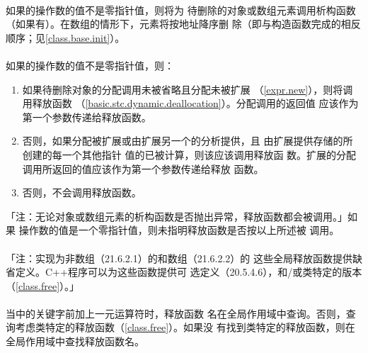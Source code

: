 \paragraph{}
如果的操作数的值不是零指针值，则将为
待删除的对象或数组元素调用析构函数（如果有）。在数组的情形下，元素将按地址降序删
除（即与构造函数完成的相反顺序；见\ref{class.base.init}）。

\paragraph{}
如果的操作数的值不是零指针值，则：
\begin{enumerate}
  \item{如果待删除对象的分配调用未被省略且分配未被扩展
    （\ref{expr.new}），则将调用释放函数
    （\ref{basic.stc.dynamic.deallocation}）。分配调用的返回值
    应该作为第一个参数传递给释放函数。}
  \item{否则，如果分配被扩展或由扩展另一个的分析提供，且
    由扩展提供存储的所创建的每一个其他指针
    值的已被计算，则该应该调用释放函
    数。扩展的分配调用所返回的值应该作为第一个参数传递给释放
    函数。}
  \item{否则，不会调用释放函数。}
\end{enumerate}
「注：无论对象或数组元素的析构函数是否抛出异常，释放函数都会被调用。」如果
操作数的值是一个零指针值，则未指明释放函数是否按以上所述被
调用。

\paragraph{}
「注：实现为非数组（21.6.2.1）的和数组（21.6.2.2）的
这些全局释放函数提供缺省定义。C++程序可以为这些函数提供可
选定义（20.5.4.6），和/或类特定的版本（\ref{class.free}）。」

\paragraph{}
当中的关键字前加上一元\tm{::}运算符时，释放函数
名在全局作用域中查询。否则，查询考虑类特定的释放函数（\ref{class.free}）。如果没
有找到类特定的释放函数，则在全局作用域中查找释放函数名。

